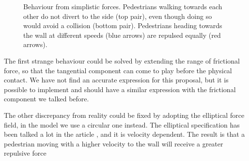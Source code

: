 \begin{figure}[h]
    \centering
    \caption[Behaviour from simplistic forces]{Behaviour from simplistic 
    forces.  Pedestrians walking towards each other 
    do not divert to the side (top pair), even though doing so would avoid a 
    collision (bottom pair).  Pedestrians 
    heading towards the wall at different speeds (blue arrows) are repulsed 
    equally (red arrows).}
    \label{fig:extra-forces-behaviour}
\end{figure}

The first strange behaviour could be solved by extending the range of 
frictional force, so that the tangential component can come to play before 
the physical contact. We have not find an accurate expression for this 
proposal, but it is possible to implement and should have a similar expression 
with the frictional component we talked before.

The other discrepancy from reality could be fixed by adopting the elliptical 
force field, in the model we use a circular one instead. 
The elliptical specification has been talked a lot in the article \cite{ABconstant}, 
and it is velocity dependent. The result is that a pedestrian moving with a 
higher velocity to the wall will receive a greater repulsive force


